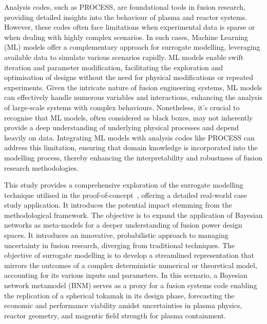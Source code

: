 \documentclass[journal]{IEEEtran}
\begin{document}
Analysis codes, such as PROCESS, are foundational tools in fusion research, providing detailed insights into the behaviour of plasma and reactor systems. However, these codes often face limitations when experimental data is sparse or when dealing with highly complex scenarios. In such cases, Machine Learning (ML) models offer a complementary approach for surrogate modelling, leveraging available data to simulate various scenarios rapidly. ML models enable swift iteration and parameter modification, facilitating the exploration and optimisation of designs without the need for physical modifications or repeated experiments. Given the intricate nature of fusion engineering systems, ML models can effectively handle numerous variables and interactions, enhancing the analysis of large-scale systems with complex behaviours. Nonetheless, it's crucial to recognise that ML models, often considered as black boxes, may not inherently provide a deep understanding of underlying physical processes and depend heavily on data. Integrating ML models with analysis codes like PROCESS can address this limitation, ensuring that domain knowledge is incorporated into the modelling process, thereby enhancing the interpretability and robustness of fusion research methodologies.

This study provides a comprehensive exploration of the surrogate modelling technique utilised in the proof-of-concept~\cite{Griffiths2024}, offering a detailed real-world case study application. It introduces the potential impact stemming from the methodological framework. The objective is to expand the application of Bayesian networks as meta-models for a deeper understanding of fusion power design spaces. It introduces an innovative, probabilistic approach to managing uncertainty in fusion research, diverging from traditional techniques. The objective of surrogate modelling is to develop a streamlined representation that mirrors the outcomes of a complex deterministic numerical or theoretical model, accounting for its various inputs and parameters. In this scenario, a Bayesian network metamodel (BNM) serves as a proxy for a fusion systems code enabling the replication of a spherical tokamak in its design phase, forecasting the economic and performance viability amidst uncertainties in plasma physics, reactor geometry, and magentic field strength for plasma containment.
\end{document}
